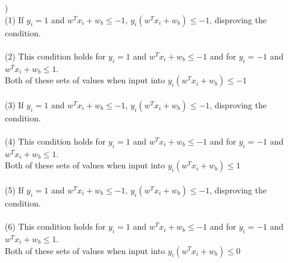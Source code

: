 \documentclass[12pt]{article}
\begin{document}
) \\
\indent (1) If $y_i = 1$ and $w^Tx_i+w_b \le -1$, $y_i(w^Tx_i+w_b) \le -1$, disproving the condition.\\\\
\indent (2) This condition holds for $y_i = 1$ and $w^Tx_i+w_b \le -1$ and for $y_i = -1$ and $w^Tx_i+w_b \le 1$. \\
\indent \indent Both of these sets of values when input into $y_i(w^Tx_i+w_b) \le -1$\\\\
\indent (3) If $y_i = 1$ and $w^Tx_i+w_b \le -1$, $y_i(w^Tx_i+w_b) \le -1$, disproving the condition.\\\\
\indent (4) This condition holds for $y_i = 1$ and $w^Tx_i+w_b \le -1$ and for $y_i = -1$ and $w^Tx_i+w_b \le 1$. \\
\indent \indent Both of these sets of values when input into $y_i(w^Tx_i+w_b) \le 1$\\\\
\indent (5) If $y_i = 1$ and $w^Tx_i+w_b \le -1$, $y_i(w^Tx_i+w_b) \le -1$, disproving the condition.\\\\
\indent (6) This condition holds for $y_i = 1$ and $w^Tx_i+w_b \le -1$ and for $y_i = -1$ and $w^Tx_i+w_b \le 1$. \\
\indent \indent Both of these sets of values when input into $y_i(w^Tx_i+w_b) \le 0$\\\\


\end{document}
